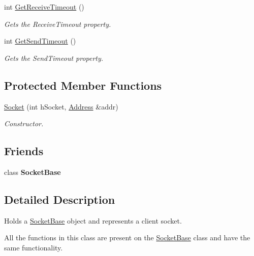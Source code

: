 \begin{DoxyCompactItemize}
int \hyperlink{class_common_1_1_socket_ac68bb0efcb17862ad732ed67eb1c14da}{Get\-Receive\-Timeout} ()
\begin{DoxyCompactList}\small\item\em Gets the Receive\-Timeout property. \end{DoxyCompactList}\item 
int \hyperlink{class_common_1_1_socket_a26a2a6fbd89320bd623a082735df6dda}{Get\-Send\-Timeout} ()
\begin{DoxyCompactList}\small\item\em Gets the Send\-Timeout property. \end{DoxyCompactList}\end{DoxyCompactItemize}
\subsection*{Protected Member Functions}
\begin{DoxyCompactItemize}
\item 
\hypertarget{class_common_1_1_socket_ae14feacfc6836ca682170f92351373b5}{\hyperlink{class_common_1_1_socket_ae14feacfc6836ca682170f92351373b5}{Socket} (int h\-Socket, \hyperlink{class_common_1_1_address}{Address} \&addr)}\label{class_common_1_1_socket_ae14feacfc6836ca682170f92351373b5}

\begin{DoxyCompactList}\small\item\em Constructor. \end{DoxyCompactList}\end{DoxyCompactItemize}
\subsection*{Friends}
\begin{DoxyCompactItemize}
\item 
\hypertarget{class_common_1_1_socket_ae958fb0a2fe39b42fcbc5d14ade88625}{class {\bfseries Socket\-Base}}\label{class_common_1_1_socket_ae958fb0a2fe39b42fcbc5d14ade88625}

\end{DoxyCompactItemize}


\subsection{Detailed Description}
Holds a \hyperlink{class_common_1_1_socket_base}{Socket\-Base} object and represents a client socket. 

All the functions in this class are present on the \hyperlink{class_common_1_1_socket_base}{Socket\-Base} class and have the same functionality.

